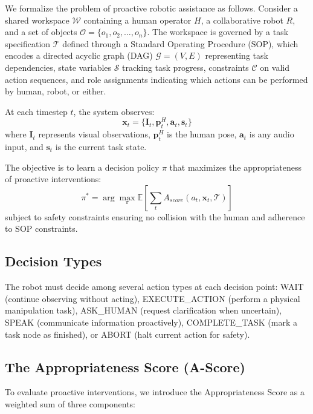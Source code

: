 \documentclass[sensors,article,submit,pdftex,moreauthors]{Definitions/mdpi}
\begin{document}
We formalize the problem of proactive robotic assistance as follows. Consider a shared workspace $\mathcal{W}$ containing a human operator $H$, a collaborative robot $R$, and a set of objects $\mathcal{O} = \{o_1, o_2, \ldots, o_n\}$. The workspace is governed by a task specification $\mathcal{T}$ defined through a Standard Operating Procedure (SOP), which encodes a directed acyclic graph (DAG) $\mathcal{G} = (V, E)$ representing task dependencies, state variables $\mathcal{S}$ tracking task progress, constraints $\mathcal{C}$ on valid action sequences, and role assignments indicating which actions can be performed by human, robot, or either.

At each timestep $t$, the system observes:
\begin{equation}
    \mathbf{x}_t = \{\mathbf{I}_t, \mathbf{p}^H_t, \mathbf{a}_t, \mathbf{s}_t\}
\end{equation}
where $\mathbf{I}_t$ represents visual observations, $\mathbf{p}^H_t$ is the human pose, $\mathbf{a}_t$ is any audio input, and $\mathbf{s}_t$ is the current task state.

The objective is to learn a decision policy $\pi$ that maximizes the appropriateness of proactive interventions:
\begin{equation}
    \pi^* = \arg\max_\pi \mathbb{E}\left[\sum_{t} A_{score}(a_t, \mathbf{x}_t, \mathcal{T})\right]
\end{equation}
subject to safety constraints ensuring no collision with the human and adherence to SOP constraints.

\subsection{Decision Types}

The robot must decide among several action types at each decision point: WAIT (continue observing without acting), EXECUTE\_ACTION (perform a physical manipulation task), ASK\_HUMAN (request clarification when uncertain), SPEAK (communicate information proactively), COMPLETE\_TASK (mark a task node as finished), or ABORT (halt current action for safety).

\subsection{The Appropriateness Score (A-Score)}

To evaluate proactive interventions, we introduce the Appropriateness Score as a weighted sum of three components:
\end{document}
